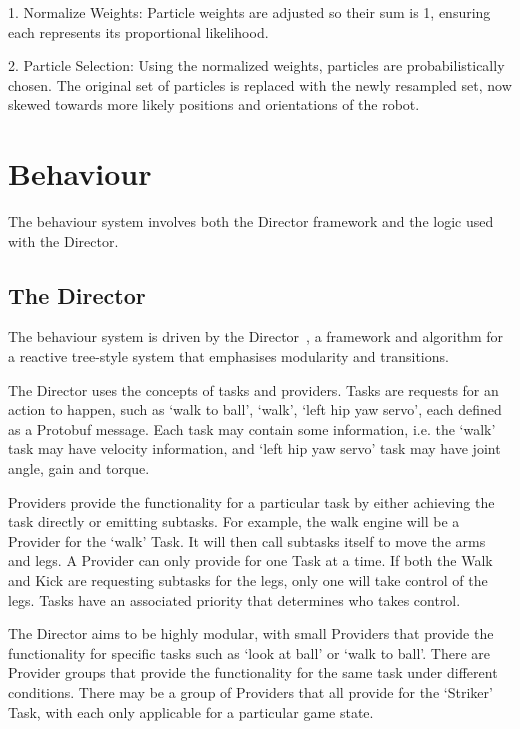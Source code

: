 \documentclass{llncs}
\begin{document}
1. Normalize Weights: Particle weights are adjusted so their sum is 1, ensuring each represents its proportional likelihood.

2. Particle Selection: Using the normalized weights, particles are probabilistically chosen. The original set of particles is replaced with the newly resampled set, now skewed towards more likely positions and orientations of the robot.



\medskip

\section{Behaviour}


The behaviour system involves both the Director framework and the logic used with the Director.

\subsection{The Director}

The behaviour system is driven by the Director~\cite{director2023}, a framework and algorithm for a reactive tree-style system that emphasises modularity and transitions.

The Director uses the concepts of tasks and providers. Tasks are requests for an action to happen, such as `walk to ball', `walk', `left hip yaw servo', each defined as a Protobuf message. Each task may contain some information, i.e. the `walk' task may have velocity information, and `left hip yaw servo' task may have joint angle, gain and torque. 

Providers provide the functionality for a particular task by either achieving the task directly or emitting subtasks. For example, the walk engine will be a Provider for the `walk' Task. It will then call subtasks itself to move the arms and legs. A Provider can only provide for one Task at a time. If both the Walk and Kick are requesting subtasks for the legs, only one will take control of the legs. Tasks have an associated priority that determines who takes control. 

The Director aims to be highly modular, with small Providers that provide the functionality for specific tasks such as `look at ball' or `walk to ball'. There are Provider groups that provide the functionality for the same task under different conditions. There may be a group of Providers that all provide for the `Striker' Task, with each only applicable for a particular game state.
\end{document}
